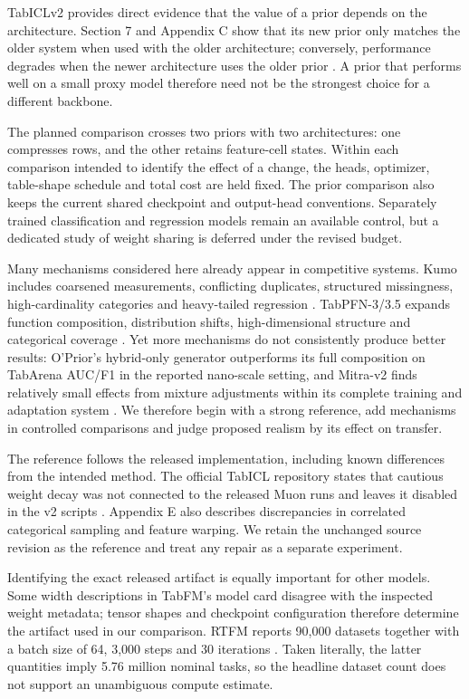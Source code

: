 \documentclass[11pt]{article}
\begin{document}
TabICLv2 provides direct evidence that the value of a prior depends on the architecture. Section 7 and Appendix C show that its new prior only matches the older system when used with the older architecture; conversely, performance degrades when the newer architecture uses the older prior \cite{tabicl2}. A prior that performs well on a small proxy model therefore need not be the strongest choice for a different backbone.

The planned comparison crosses two priors with two architectures: one compresses rows, and the other retains feature-cell states. Within each comparison intended to identify the effect of a change, the heads, optimizer, table-shape schedule and total cost are held fixed. The prior comparison also keeps the current shared checkpoint and output-head conventions. Separately trained classification and regression models remain an available control, but a dedicated study of weight sharing is deferred under the revised budget.

Many mechanisms considered here already appear in competitive systems. Kumo includes coarsened measurements, conflicting duplicates, structured missingness, high-cardinality categories and heavy-tailed regression \cite{kumo}. TabPFN-3/3.5 expands function composition, distribution shifts, high-dimensional structure and categorical coverage \cite{tabpfn3,tabpfn35}. Yet more mechanisms do not consistently produce better results: O'Prior's hybrid-only generator outperforms its full composition on TabArena AUC/F1 in the reported nano-scale setting, and Mitra-v2 finds relatively small effects from mixture adjustments within its complete training and adaptation system \cite{oprior,mitra2}. We therefore begin with a strong reference, add mechanisms in controlled comparisons and judge proposed realism by its effect on transfer.

The reference follows the released implementation, including known differences from the intended method. The official TabICL repository states that cautious weight decay was not connected to the released Muon runs and leaves it disabled in the v2 scripts \cite{tabicl-code}. Appendix E also describes discrepancies in correlated categorical sampling and feature warping. We retain the unchanged source revision as the reference and treat any repair as a separate experiment.

Identifying the exact released artifact is equally important for other models. Some width descriptions in TabFM's model card disagree with the inspected weight metadata; tensor shapes and checkpoint configuration therefore determine the artifact used in our comparison. RTFM reports 90,000 datasets together with a batch size of 64, 3,000 steps and 30 iterations \cite{rtfm}. Taken literally, the latter quantities imply 5.76 million nominal tasks, so the headline dataset count does not support an unambiguous compute estimate.
\end{document}
